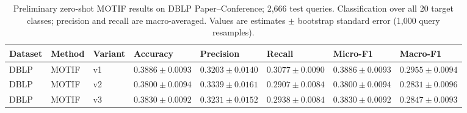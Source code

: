 \begin{table}[htbp]
\centering
\small
\renewcommand{\arraystretch}{1.15}
\setlength{\tabcolsep}{5pt}
\begin{adjustbox}{max width=\linewidth}
\begin{tabular}{|l|l|l|l|l|l|l|l|}
\hline
\textbf{Dataset} & \textbf{Method} & \textbf{Variant} & \textbf{Accuracy} & \textbf{Precision} & \textbf{Recall} & \textbf{Micro-F1} & \textbf{Macro-F1} \\
\hline
DBLP & MOTIF & v1 & $0.3886 \pm 0.0093$ & $0.3203 \pm 0.0140$ & $0.3077 \pm 0.0090$ & $0.3886 \pm 0.0093$ & $0.2955 \pm 0.0094$ \\
\hline
DBLP & MOTIF & v2 & $0.3800 \pm 0.0094$ & $0.3339 \pm 0.0161$ & $0.2907 \pm 0.0084$ & $0.3800 \pm 0.0094$ & $0.2831 \pm 0.0096$ \\
\hline
DBLP & MOTIF & v3 & $0.3830 \pm 0.0092$ & $0.3231 \pm 0.0152$ & $0.2938 \pm 0.0084$ & $0.3830 \pm 0.0092$ & $0.2847 \pm 0.0093$ \\
\hline
\end{tabular}
\end{adjustbox}
\caption{Preliminary zero-shot MOTIF results on DBLP Paper--Conference; 2,666 test queries. Classification over all 20 target classes; precision and recall are macro-averaged. Values are estimates $\pm$ bootstrap standard error (1,000 query resamples).}
\label{tab:motif-dblp-paper-conference-classification}
\end{table}
